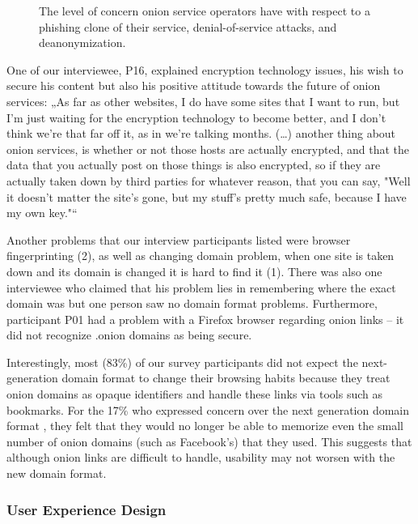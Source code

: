 \begin{figure}[t]
    \centering
    
    \caption{The level of concern onion service operators have with respect to a
    phishing clone of their service, denial-of-service attacks, and
    deanonymization.}
    \label{fig:onion-operation-concerns}
\end{figure}

One of our interviewee, P16, explained encryption technology issues, his wish to secure his content but also his positive attitude towards the future of onion services: „As far as other websites, I do have some sites that I want to run, but I'm just waiting for the encryption technology to become better, and I don't think we're that far off it, as in we're talking months. (…) another thing about onion services, is whether or not those hosts are actually encrypted, and that the data that you actually post on those things is also encrypted, so if they are actually taken down by third parties for whatever reason, that you can say, "Well it doesn't matter the site's gone, but my stuff's pretty much safe, because I have my own key."“

Another problems that our interview participants listed were browser fingerprinting (2), as well as changing domain problem, when one site is taken down and its domain is changed it is hard to find it (1). There was also one interviewee who claimed that his problem lies in remembering where the exact domain was but one person saw no domain format problems. Furthermore, participant P01 had a problem with a Firefox  browser regarding onion links – it did not recognize .onion domains as being secure. 

Interestingly, most (83\%) of our survey participants did not expect the
next-generation domain format to change their browsing habits because they treat onion domains as
opaque identifiers and handle these links via tools such as bookmarks.  For the 17\% who expressed concern over the next generation domain format , they felt that they would no longer be able to memorize even the small
number of onion domains (such as Facebook's) that they used.
 This suggests that although onion links are difficult to handle, usability may not worsen with the new domain format.


\subsubsection{User Experience Design}


